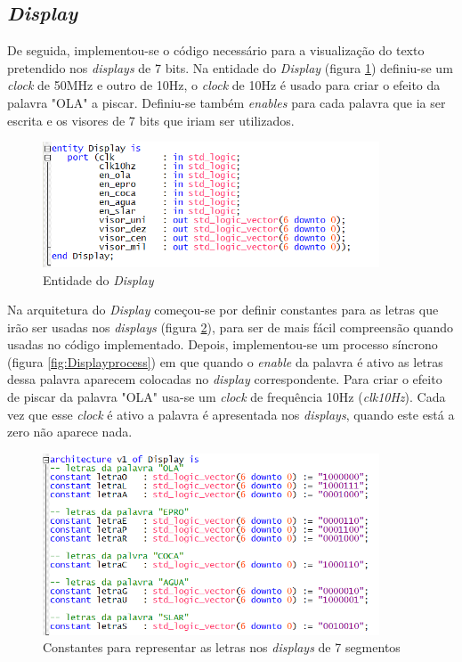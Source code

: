 \documentclass{report}
\begin{document}
\newpage

\subsection{\textit{Display}}
De seguida, implementou-se o código necessário para a visualização do texto pretendido nos \textit{displays} de 7 bits. Na entidade do \textit{Display} (figura \ref{fig:Displayentity}) definiu-se um \textit{clock} de 50MHz e outro de 10Hz, o \textit{clock} de 10Hz é usado para criar o efeito da palavra "OLA" a piscar. Definiu-se também \textit{enables} para cada palavra que ia ser escrita e os visores de 7 bits que iriam ser utilizados.

\begin{figure}[H]
    \centering
    \includegraphics[width = 10cm]{Display1entity.png}
    \caption{Entidade do \textit{Display}}
    \label{fig:Displayentity}
\end{figure}

Na arquitetura do \textit{Display} começou-se por definir constantes para as letras que irão ser usadas nos \textit{displays} (figura \ref{fig:Letras1}), para ser de mais fácil compreensão quando usadas no código implementado. Depois, implementou-se um processo síncrono (figura \ref{fig:Displayprocess}) em que quando o \textit{enable} da palavra é ativo as letras dessa palavra aparecem colocadas no \textit{display} correspondente. Para criar o efeito de piscar da palavra "OLA" usa-se um \textit{clock} de frequência 10Hz (\textit{clk10Hz}). Cada vez que esse \textit{clock} é ativo a palavra é apresentada nos \textit{displays}, quando este está a zero não aparece nada.  

\begin{figure}[H]
    \centering
    \includegraphics[width = 10cm]{DisplayLetras.png}
    \caption{Constantes para representar as letras nos \textit{displays} de 7 segmentos}
    \label{fig:Letras1}
\end{figure}
\end{document}
